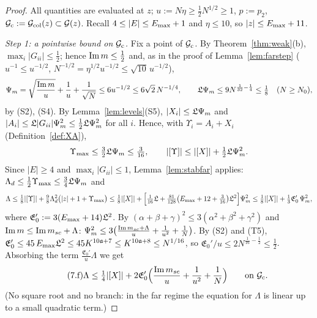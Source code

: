 \begin{proof}
All quantities are evaluated at $z$; $u:=N\eta\ge\frac12N^{1/2}\ge1$, $p:=p_2$, $\mathcal{G}_{\rm c}:=\mathcal{G}_{\rm col}(z)\subset\mathcal{G}(z)$. Recall $4\le|E|\le E_{\max}+1$ and $\eta\le10$, so $|z|\le E_{\max}+11$.

\emph{Step 1: a pointwise bound on $\mathcal{G}_{\rm c}$.} Fix a point of $\mathcal{G}_{\rm c}$. By Theorem~\ref{thm:weak}(b), $\max_i|G_{ii}|\le\frac12$; hence $\operatorname{Im} m\le\frac12$ and, as in the proof of Lemma~\ref{lem:farstep} ($u^{-1}\le u^{-1/2}$, $N^{-1/2}=\eta^{1/2}u^{-1/2}\le\sqrt{10}\,u^{-1/2}$),
\[
 \Psi_m=\sqrt{\frac{\operatorname{Im} m}{u}}+\frac1u+\frac1{\sqrt N}\le6u^{-1/2}\le6\sqrt2\,N^{-1/4},\qquad\mathfrak{L}\Psi_m\le9N^{\frac1{32}-\frac14}\le\tfrac18\quad(N\ge N_0),
\]
by (S2), (S4). By Lemma~\ref{lem:levels}(S5), $|X_i|\le\mathfrak{L}\Psi_m$ and $|A_i|\le\mathfrak{L}|G_{ii}|\Psi_m^2\le\frac12\mathfrak{L}\Psi_m^2$ for all $i$. Hence, with $\Upsilon_i=A_i+X_i$ (Definition~\ref{def:XA}),
\[
 \Upsilon_{\max}\le\tfrac32\mathfrak{L}\Psi_m\le\tfrac3{16},\qquad|[\Upsilon]|\le|[X]|+\tfrac12\mathfrak{L}\Psi_m^2 .
\]
Since $|E|\ge4$ and $\max_i|G_{ii}|\le1$, Lemma~\ref{lem:stabfar} applies: $\Lambda_d\le\frac12\Upsilon_{\max}\le\frac34\mathfrak{L}\Psi_m$ and
\[
 \Lambda\le\tfrac18|[\Upsilon]|+\tfrac98\Lambda_d^2\big(|z|+1+\Upsilon_{\max}\big)\le\tfrac18|[X]|+\Big[\tfrac1{16}\mathfrak{L}+\tfrac{81}{128}\big(E_{\max}+12+\tfrac3{16}\big)\mathfrak{L}^2\Big]\Psi_m^2\le\tfrac18|[X]|+\tfrac13\mathfrak E_0'\,\Psi_m^2,
\]
where $\mathfrak E_0':=3(E_{\max}+14)\mathfrak{L}^2$. By $(\alpha+\beta+\gamma)^2\le3(\alpha^2+\beta^2+\gamma^2)$ and $\operatorname{Im} m\le\operatorname{Im}m_{sc}+\Lambda$: $\Psi_m^2\le3\big(\frac{\operatorname{Im}m_{sc}+\Lambda}{u}+\frac1{u^2}+\frac1N\big)$. By (S2) and (T5),
$\mathfrak E_0'\le45\,E_{\max}\mathfrak{L}^2\le45K^{10\mathfrak{a}+7}\le K^{10\mathfrak{a}+8}\le N^{1/16}$, so $\mathfrak E_0'/u\le2N^{\frac1{16}-\frac12}\le\frac12$. Absorbing the term $\frac{\mathfrak E_0'}{u}\Lambda$ we get
\begin{equation}\tag{7.f}\label{eq:a5-7f}
 \Lambda\le\tfrac14|[X]|+2\mathfrak E_0'\Big(\frac{\operatorname{Im}m_{sc}}{u}+\frac1{u^2}+\frac1N\Big)\qquad\text{on }\mathcal{G}_{\rm c}.
\end{equation}
(No square root and no branch: in the far regime the equation for $\Lambda$ is linear up to a small quadratic term.)


\end{proof}
